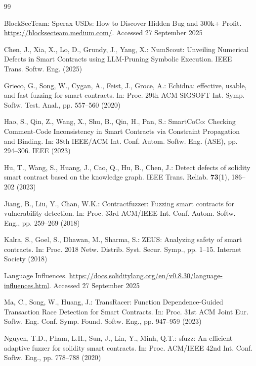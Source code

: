 \documentclass[pdflatex,sn-basic]{sn-jnl}%
\theoremstyle{thmstyleone}%
\theoremstyle{thmstyletwo}%
\theoremstyle{thmstylethree}%
\begin{document}
\begin{thebibliography}{99}

 BlockSecTeam: Sperax USDs: How to Discover Hidden Bug and 300k+ Profit. \url{https://blocksecteam.medium.com/}. Accessed 27 September 2025

 Chen, J., Xia, X., Lo, D., Grundy, J., Yang, X.: NumScout: Unveiling Numerical Defects in Smart Contracts using LLM-Pruning Symbolic Execution. IEEE Trans. Softw. Eng. (2025)

 Grieco, G., Song, W., Cygan, A., Feist, J., Groce, A.: Echidna: effective, usable, and fast fuzzing for smart contracts. In: Proc. 29th ACM SIGSOFT Int. Symp. Softw. Test. Anal., pp. 557--560 (2020)

 Hao, S., Qin, Z., Wang, X., Shu, B., Qin, H., Pan, S.: SmartCoCo: Checking Comment-Code Inconsistency in Smart Contracts via Constraint Propagation and Binding. In: 38th IEEE/ACM Int. Conf. Autom. Softw. Eng. (ASE), pp. 294--306. IEEE (2023)

 Hu, T., Wang, S., Huang, J., Cao, Q., Hu, B., Chen, J.: Detect defects of solidity smart contract based on the knowledge graph. IEEE Trans. Reliab. \textbf{73}(1), 186--202 (2023)

 Jiang, B., Liu, Y., Chan, W.K.: Contractfuzzer: Fuzzing smart contracts for vulnerability detection. In: Proc. 33rd ACM/IEEE Int. Conf. Autom. Softw. Eng., pp. 259--269 (2018)

 Kalra, S., Goel, S., Dhawan, M., Sharma, S.: ZEUS: Analyzing safety of smart contracts. In: Proc. 2018 Netw. Distrib. Syst. Secur. Symp., pp. 1--15. Internet Society (2018)

 Language Influences. \url{https://docs.soliditylang.org/en/v0.8.30/language-influences.html}. Accessed 27 September 2025

 Ma, C., Song, W., Huang, J.: TransRacer: Function Dependence-Guided Transaction Race Detection for Smart Contracts. In: Proc. 31st ACM Joint Eur. Softw. Eng. Conf. Symp. Found. Softw. Eng., pp. 947--959 (2023)

 Nguyen, T.D., Pham, L.H., Sun, J., Lin, Y., Minh, Q.T.: sfuzz: An efficient adaptive fuzzer for solidity smart contracts. In: Proc. ACM/IEEE 42nd Int. Conf. Softw. Eng., pp. 778--788 (2020)


\end{thebibliography}
\end{document}

